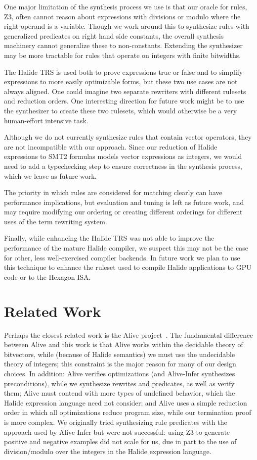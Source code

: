 \documentclass[acmsmall,review,anonymous]{acmart}\settopmatter{printfolios=true,printccs=false,printacmref=false}
\begin{document}
One major limitation of the synthesis process we use is that our oracle
for rules, Z3, often cannot reason about expressions with divisions or modulo
where the right operand is a variable.  Though we work around this to
synthesize rules with generalized predicates on right hand side constants,
the overall synthesis machinery cannot generalize these to non-constants.
Extending the synthesizer may be more tractable for rules that operate
on integers with finite bitwidths.

The Halide TRS is used both to prove expressions true or false and to
simplify expressions to more easily optimizable forms, but these two use cases
are not always aligned. One could imagine two separate rewriters with
different rulesets and reduction orders. One interesting direction for future
work might be to use the synthesizer to create these two rulesets, which would
otherwise be a very human-effort intensive task.

Although we do not currently synthesize rules that contain vector operators,
they are not incompatible with our approach. Since our reduction of Halide
expressions to SMT2 formulas models vector expressions as integers, we would need
to add a typechecking step to ensure correctness in the synthesis process, which
we leave as future work.

The priority in which rules are considered for matching clearly can have
performance implications, but evaluation and tuning is left as future work, and
may require modifying our ordering or creating different orderings for different
uses of the term rewriting system.

Finally, while enhancing the Halide TRS was not able to improve the performance of the mature Halide compiler, we suspect this may not be the case for other, less well-exercised compiler backends. In future work we plan to use this technique to enhance the ruleset used to compile Halide applications to GPU code or to the Hexagon ISA.

\section{Related Work}
Perhaps the closest related work is the Alive project~\cite{lopes2015alive,menendez2017aliveinfer}.
The fundamental difference between Alive and this
work is that Alive works within the decidable theory of bitvectors, while
(because of Halide semantics) we must use the undecidable theory of integers;
this constraint is the major reason for many of our design choices. In addition:
Alive verifies optimizations (and Alive-Infer synthesizes preconditions), while
we synthesize rewrites and predicates, as well as verify them; Alive must contend
with more types of undefined behavior, which the Halide expression
language need not consider; and Alive uses a simple reduction order in
which all optimizations reduce program size, while our termination proof is more
complex. We originally tried synthesizing rule predicates with the approach used
by Alive-Infer but were not successful: using Z3 to generate positive and
negative examples did not scale for us, due in part to the use of
division/modulo over the integers in the Halide expression language.
\end{document}
